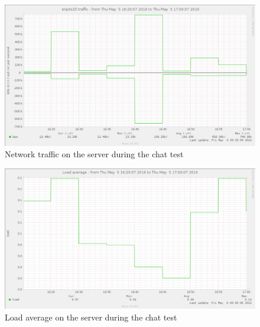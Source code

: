 \begin{figure}
    \includegraphics[width=\textwidth]{figure/serversidePerformance/2016-05-05-network-traffic-chat.png}
    \caption{Network traffic on the server during the chat test}
    \label{fig:network-results-attachment}
\end{figure}

\begin{figure}
    \includegraphics[width=\textwidth]{figure/serversidePerformance/2016-05-05-load-average-chatting-tests.png}
    \caption{Load average on the server during the chat test}
    \label{fig:load-average-results-attachment}
\end{figure}

